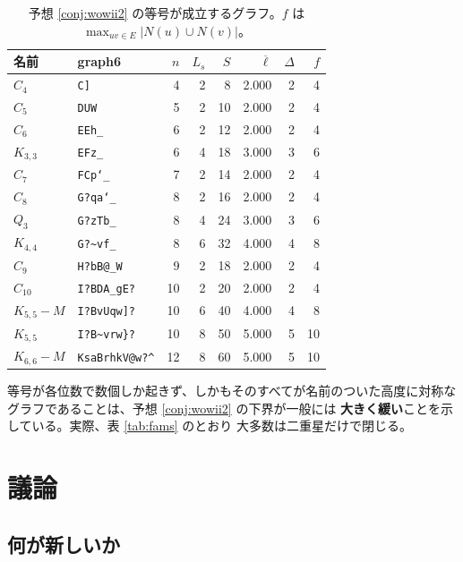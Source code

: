 \documentclass[paper=a4,fontsize=10.5pt,jafontsize=10.5pt]{jlreq}
\theoremstyle{plain}
\theoremstyle{definition}
\begin{document}
\begin{table}[t]
\centering
\caption{予想 \ref{conj:wowii2} の等号が成立するグラフ。$f$ は
$\max_{uv \in E}|N(u) \cup N(v)|$。}\label{tab:eq}
\begin{tabular}{llrrrrrr}
\toprule
名前 & graph6 & $n$ & $L_s$ & $S$ & $\overline{\ell}$ & $\Delta$ & $f$ \\
\midrule
$C_{4}$ & \texttt{C]} & 4 & 2 & 8 & 2.000 & 2 & 4 \\
$C_{5}$ & \texttt{DUW} & 5 & 2 & 10 & 2.000 & 2 & 4 \\
$C_{6}$ & \texttt{EEh\_} & 6 & 2 & 12 & 2.000 & 2 & 4 \\
$K_{3,3}$ & \texttt{EFz\_} & 6 & 4 & 18 & 3.000 & 3 & 6 \\
$C_{7}$ & \texttt{FCp`\_} & 7 & 2 & 14 & 2.000 & 2 & 4 \\
$C_{8}$ & \texttt{G?qa`\_} & 8 & 2 & 16 & 2.000 & 2 & 4 \\
$Q_3$ & \texttt{G?zTb\_} & 8 & 4 & 24 & 3.000 & 3 & 6 \\
$K_{4,4}$ & \texttt{G?\textasciitilde{}vf\_} & 8 & 6 & 32 & 4.000 & 4 & 8 \\
$C_{9}$ & \texttt{H?bB@\_W} & 9 & 2 & 18 & 2.000 & 2 & 4 \\
$C_{10}$ & \texttt{I?BDA\_gE?} & 10 & 2 & 20 & 2.000 & 2 & 4 \\
$K_{5,5} - M$ & \texttt{I?BvUqw]?} & 10 & 6 & 40 & 4.000 & 4 & 8 \\
$K_{5,5}$ & \texttt{I?B\textasciitilde{}vrw\}?} & 10 & 8 & 50 & 5.000 & 5 & 10 \\
$K_{6,6} - M$ & \texttt{KsaBrhkV@w?\textasciicircum{}} & 12 & 8 & 60 & 5.000 & 5 & 10 \\
\bottomrule
\end{tabular}
\end{table}

等号が各位数で数個しか起きず、しかもそのすべてが名前のついた高度に対称なグラフであることは、予想 \ref{conj:wowii2} の下界が一般には
\textbf{大きく緩い}ことを示している。実際、表 \ref{tab:fams} のとおり
大多数は二重星だけで閉じる。

\section{議論}\label{sec:disc}

\subsection*{何が新しいか}
\end{document}
